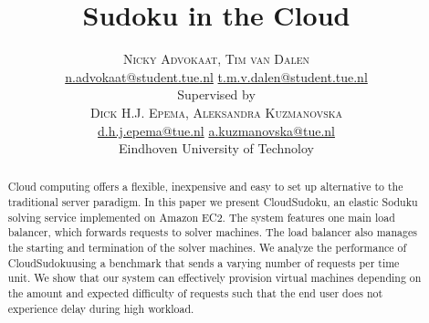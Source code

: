 \documentclass[twoside]{article}
\title{\vspace{-15mm}\fontsize{24pt}{10pt}\selectfont\textbf{Sudoku in the Cloud}} %
\author{
\large
\textsc{Nicky Advokaat, Tim van Dalen}\\[1mm] %
\normalsize \href{mailto:n.advokaat@student.tue.nl}{n.advokaat@student.tue.nl} \href{mailto:t.m.v.dalen@student.tue.nl}{t.m.v.dalen@student.tue.nl}\\[2mm] %
\normalsize Supervised by \\
\textsc{Dick H.J. Epema, Aleksandra Kuzmanovska}\\[1mm]
\normalsize \href{mailto:d.h.j.epema@tue.nl}{d.h.j.epema@tue.nl} \href{mailto:a.kuzmanovska@tue.nl}{a.kuzmanovska@tue.nl}\\[2mm] 
\normalsize Eindhoven University of Technoloy \\ %
\vspace{-5mm}
}
\date{}
\newcommand{\appName}{CloudSudoku}
\begin{document}
\maketitle %

\thispagestyle{fancy} %


\begin{abstract}

Cloud computing offers a flexible, inexpensive and easy to set up alternative to the traditional server paradigm. In this paper we present \appName, an elastic Soduku solving service implemented on Amazon EC2. The system features one main load balancer, which forwards requests to solver machines. The load balancer also manages the starting and termination of the solver machines. We analyze the performance of \appName using a benchmark that sends a varying number of requests per time unit. We show that our system can effectively provision virtual machines depending on the amount and expected difficulty of requests such that the end user does not experience delay during high workload.

\end{abstract}

\end{document}
